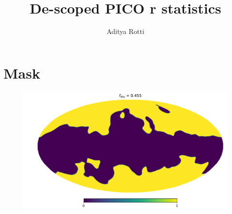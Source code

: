 \documentclass[11pt]{article}
\begin{document}
\title{De-scoped PICO r statistics}
\author{Aditya Rotti}
\date{}
\maketitle


\newpage


\newpage
\section{Mask}
\begin{figure}
\centering
\includegraphics[width=1.2\textwidth]{mask.pdf}
\end{figure}
\end{document}
